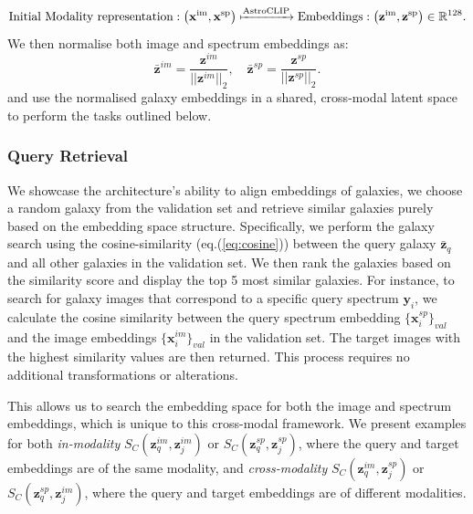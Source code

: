 \documentclass[a4paper,12pt]{article}
\begin{document}
\begin{equation}
    \text{Initial Modality representation} : \left( \mathbf{x}^{\text{im}}, \mathbf{x}^{\text{sp}} \right) \xmapsto{\text{AstroCLIP}} \text{Embeddings} : \left( \mathbf{z}^{\text{im}}, \mathbf{z}^{\text{sp}} \right) \in \mathbb{R}^{128}.
\end{equation}
We then normalise both image and spectrum embeddings as:
\begin{equation}
    \mathbf{\bar{z}}^{im} =  \frac{\mathbf{z}^{im} }{|| \mathbf{z}^{im} ||_2}, \quad \mathbf{\bar{z}}^{sp} =  \frac{\mathbf{z}^{sp} }{|| \mathbf{z}^{sp} ||_2}.
\end{equation}
and use the normalised galaxy embeddings in a shared, cross-modal latent space to perform the tasks outlined below.

\subsubsection*{Query Retrieval}
We showcase the architecture's ability to align embeddings of galaxies, we choose a random galaxy from the validation set and retrieve similar galaxies purely based on the embedding space structure. Specifically, we perform the galaxy search using the cosine-similarity (eq.(\ref{eq:cosine})) between the query galaxy $\bar{\mathbf{z}}_q$ and all other galaxies in the validation set. We then rank the galaxies based on the similarity score and display the top 5 most similar galaxies. For instance, to search for galaxy images that correspond to a specific query spectrum $\mathbf{y}_i$, we calculate the cosine similarity between the query spectrum embedding $\{\mathbf{x}^{sp}_i\}_{val}$ and the image embeddings $\{\mathbf{x}^{im}_i\}_{val}$ in the validation set. The target images with the highest similarity values are then returned. This process requires no additional transformations or alterations.

This allows us to search the embedding space for both the image and spectrum embeddings, which is unique to this cross-modal framework. We present examples for both \emph{in-modality} $S_{C}(\mathbf{z}^{im}_q, \mathbf{z}^{im}_j)$ or $S_{C}(\mathbf{z}^{sp}_q, \mathbf{z}^{sp}_j)$, where the query and target embeddings are of the same modality, and \emph{cross-modality} $S_{C}(\mathbf{z}^{im}_q, \mathbf{z}^{sp}_j)$ or $S_{C}(\mathbf{z}^{sp}_q, \mathbf{z}^{im}_j)$, where the query and target embeddings are of different modalities.
\end{document}
